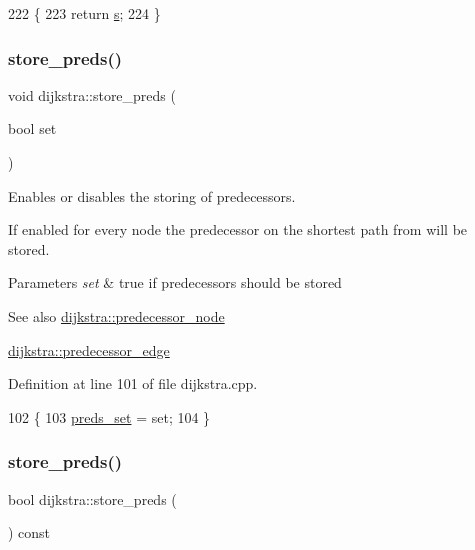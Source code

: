 \begin{DoxyCode}
222 \{
223     \textcolor{keywordflow}{return} \mbox{\hyperlink{classdijkstra_a721bfb648626a1be2b9d276d85ebdb9d}{s}};
224 \}
\end{DoxyCode}
\mbox{\label{classdijkstra_af79383dbbb6b737afcefd8e32350192d}} 
\subsubsection{\texorpdfstring{store\+\_\+preds()}{store\_preds()}\hspace{0.1cm}{\footnotesize\ttfamily [1/2]}}
{\footnotesize\ttfamily void dijkstra\+::store\+\_\+preds (\begin{DoxyParamCaption}\item[{bool}]{set }\end{DoxyParamCaption})}



Enables or disables the storing of predecessors. 

If enabled for every node the predecessor on the shortest path from will be stored.


\begin{DoxyParams}{Parameters}
{\em set} & {\ttfamily true} if predecessors should be stored\\
\hline
\end{DoxyParams}
\begin{DoxySeeAlso}{See also}
\mbox{\hyperlink{classdijkstra_a99c17ee7c2b55574ea8c2952fac09faf}{dijkstra\+::predecessor\+\_\+node}} 

\mbox{\hyperlink{classdijkstra_aa3ef1a7d7dfc33e4a39aff309f873929}{dijkstra\+::predecessor\+\_\+edge}} 
\end{DoxySeeAlso}


Definition at line 101 of file dijkstra.\+cpp.


\begin{DoxyCode}
102 \{
103     \mbox{\hyperlink{classdijkstra_aaba530e703b5d4005b3c01fa1a11182d}{preds\_set}} = \textcolor{keyword}{set};
104 \}
\end{DoxyCode}
\mbox{\label{classdijkstra_a8ef3ee087994a56b774f48fd331725a3}} 
\subsubsection{\texorpdfstring{store\+\_\+preds()}{store\_preds()}\hspace{0.1cm}{\footnotesize\ttfamily [2/2]}}
{\footnotesize\ttfamily bool dijkstra\+::store\+\_\+preds (\begin{DoxyParamCaption}{ }\end{DoxyParamCaption}) const}




